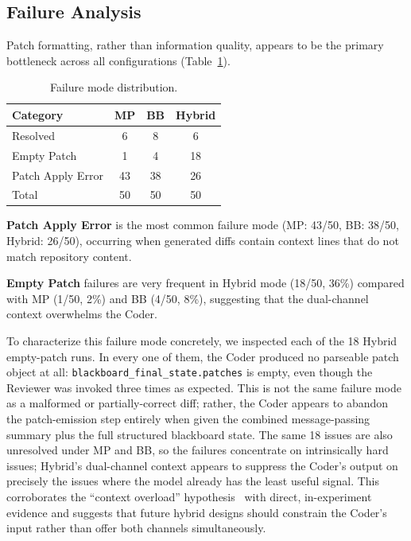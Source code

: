 \documentclass{ieeeaccess}
\begin{document}
\subsection{Failure Analysis}

Patch formatting, rather than information quality, appears to be the primary bottleneck across all configurations (Table~\ref{tab:failures}).

\begin{table}[!ht]
\centering
\caption{Failure mode distribution.}
\label{tab:failures}
\begin{tabular}{lccc}
\toprule
\textbf{Category} & \textbf{MP} & \textbf{BB} & \textbf{Hybrid} \\
\midrule
Resolved & 6 & 8 & 6 \\
Empty Patch & 1 & 4 & 18 \\
Patch Apply Error & 43 & 38 & 26 \\
\midrule
Total & 50 & 50 & 50 \\
\bottomrule
\end{tabular}
\end{table}

\textbf{Patch Apply Error} is the most common failure mode (MP: 43/50, BB: 38/50, Hybrid: 26/50), occurring when generated diffs contain context lines that do not match repository content.

\textbf{Empty Patch} failures are very frequent in Hybrid mode (18/50, 36\%) compared with MP (1/50, 2\%) and BB (4/50, 8\%), suggesting that the dual-channel context overwhelms the Coder.

To characterize this failure mode concretely, we inspected each of the 18 Hybrid empty-patch runs. In every one of them, the Coder produced no parseable patch object at all: \texttt{blackboard\_final\_state.patches} is empty, even though the Reviewer was invoked three times as expected. This is not the same failure mode as a malformed or partially-correct diff; rather, the Coder appears to abandon the patch-emission step entirely when given the combined message-passing summary plus the full structured blackboard state. The same 18 issues are also unresolved under MP and BB, so the failures concentrate on intrinsically hard issues; Hybrid's dual-channel context appears to suppress the Coder's output on precisely the issues where the model already has the least useful signal. This corroborates the ``context overload'' hypothesis~\cite{liu2024lost} with direct, in-experiment evidence and suggests that future hybrid designs should constrain the Coder's input rather than offer both channels simultaneously.
\end{document}

